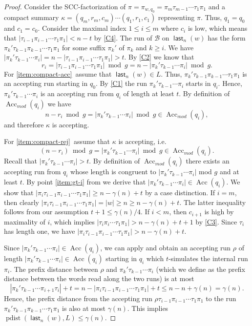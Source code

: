 \documentclass{article}\usepackage[a4paper,margin=20mm]{geometry}
\newcommand{\B}{\mathcal{B}}
\DeclareMathOperator{\last}{\mathsf{last}}
\DeclareMathOperator{\pdist}{pdist}
\DeclareMathOperator{\Acc}{Acc}
\renewcommand{\geq}{\geqslant}
\renewcommand{\leq}{\leqslant}
\renewcommand{\ge}{\geq}
\renewcommand{\le}{\leq}
\begin{document}
\begin{proof}
Consider the SCC-factorization of $\pi = \pi_{w,q_0} = \pi_m \tau_{m-1} \cdots \tau_1 \pi_1$
and a compact summary $\kappa = (q_m, r_m, c_m) \cdots (q_1, r_1, c_1)$ representing $\pi$.
Thus, $q_1 = q_0$ and $c_1 = c_0$.
Consider the maximal index $1 \le i \le m$ where $c_i$ is low,
which means that $|\tau_{i-1} \pi_{i-1} \cdots \tau_1 \pi_1| < n-t$ by \ref{C4}.
The run of $\B$ on $\last_n(w)$ has the form $\pi_k' \tau_{k-1} \pi_{k-1} \cdots \tau_1 \pi_1$
for some suffix $\pi_k'$ of $\pi_k$ and $k \geq i$.
We have $|\pi_k' \tau_{k-1} \cdots \pi_i| = n - |\tau_{i-1} \pi_{i-1} \cdots \tau_1 \pi_1| > t$.
By \ref{C2} we know that
\[
	r_i = |\tau_{i-1} \pi_{i-1} \cdots \tau_1 \pi_1| \bmod {g} = n - |\pi_k' \tau_{k-1} \cdots \pi_i| \bmod {g}.
\]
For \ref{item:compact-acc}~assume that $\last_n(w) \in L$.
Thus, $\pi_k' \tau_{k-1} \pi_{k-1} \cdots \tau_1 \pi_1$
is an accepting run starting in $q_0$.
By \ref{C1} the run $\pi_k' \tau_{k-1} \cdots \pi_i$ starts in $q_i$.
Hence, $\pi_k' \tau_{k-1} \cdots \pi_i$ is an accepting run from $q_i$ of length at least $t$.
By definition of $\Acc_{\mathit{mod}}(q_i)$ we have
\[
	n - r_i \bmod {g} = |\pi_k' \tau_{k-1} \cdots \pi_i| \bmod {g}  \in \Acc_{\mathit{mod}}(q_i),
\]
and therefore $\kappa$ is accepting.

For \ref{item:compact-rej}~assume that $\kappa$ is accepting,
i.e.
\[
	(n - r_i) \bmod g = |\pi_k' \tau_{k-1} \cdots \pi_i|  \bmod g \in \Acc_{\mathit{mod}}(q_i).
\]
Recall that $|\pi_k' \tau_{k-1} \cdots \pi_i| > t$.
By definition of $\Acc_{\mathit{mod}}(q_i)$ there exists an accepting run from $q_i$
whose length is congruent to $|\pi_k' \tau_{k-1} \cdots \pi_i|$ mod $g$
and at least $t$.
By point \ref{item:gt-i} from  we derive that $|\pi_k' \tau_{k-1} \cdots \pi_i| \in \Acc(q_i)$.
We show that $|\pi_i \tau_{i-1} \pi_{i-1} \cdots \tau_1 \pi_1| \ge n-\gamma(n)+t$ by a case distinction.
If $i = m$, then clearly $|\pi_i \tau_{i-1} \pi_{i-1} \cdots \tau_1 \pi_1| = |w| \ge n \ge n-\gamma(n)+t$.
The latter inequality follows from our assumption $t+1 \le \gamma(n)/4$.
If $i < m$, then $c_{i+1}$ is high by maximality of $i$,
which implies $|\tau_i \pi_i \cdots \tau_1 \pi_1| > n-\gamma(n) + t+1$ by \ref{C3}.
Since $\tau_i$ has length one, we have
$|\pi_i \tau_{i-1} \pi_{i-1} \cdots \tau_1 \pi_1| > n-\gamma(n)+t$.

Since $|\pi_k' \tau_{k-1} \cdots \pi_i| \in \Acc(q_i)$,
we can apply  and obtain an accepting run $\rho$
of length $|\pi_k' \tau_{k-1} \cdots \pi_i| \in \Acc(q_i)$ starting in $q_i$
which $t$-simulates the internal run $\pi_i$.
The prefix distance between $\rho$ and $\pi_k' \tau_{k-1} \cdots \pi_i$ (which we define as the prefix
distance between the words read along the two runs) is at most
\[
	|\pi_k' \tau_{k-1} \cdots \pi_{i+1} \tau_i| + t = n - |\pi_i \tau_{i-1} \pi_{i-1} \cdots \tau_1 \pi_1| + t \le n
	- n+\gamma(n) = \gamma(n).
\]
Hence, the prefix distance from the accepting run $\rho \tau_{i-1} \pi_{i-1} \cdots \tau_1 \pi_1$
to the run $\pi_k' \tau_{k-1} \pi_{k-1} \cdots \tau_1 \pi_1$ is also at most $\gamma(n)$.
This implies  $\pdist(\last_n(w),L) \le \gamma(n)$.
\end{proof}
\end{document}
